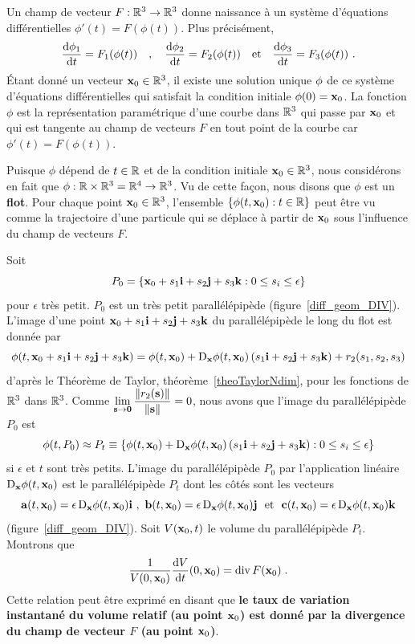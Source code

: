 {Un champ de vecteur $F:\mathbb{R}^3 \to \mathbb{R}^3$ donne naissance à un
système d'équations différentielles $\phi'(t) = F(\phi(t))$.
Plus précisément, 
\[
  \frac{\mathrm{d}\phi_1}{\mathrm{d}t} = F_1(\phi(t)) \quad , \quad
  \frac{\mathrm{d}\phi_2}{\mathrm{d}t} = F_2(\phi(t)) \quad \text{et} \quad
  \frac{\mathrm{d}\phi_3}{\mathrm{d}t} = F_3(\phi(t)) \ .
\]
Étant donné un vecteur $\mathbf{x}_0 \in \mathbb{R}^3$, il existe une solution
unique $\mathbf{\phi}$ de ce système d'équations différentielles qui
satisfait la condition initiale $\phi(0) = \mathbf{x}_0$.  La fonction
$\phi$ est la représentation paramétrique d'une courbe dans $\mathbb{R}^3$
qui passe par $\mathbf{x}_0$ et qui est tangente au champ de vecteurs
$F$ en tout point de la courbe car $\phi'(t) = F(\phi(t))$.

Puisque $\phi$ dépend de $t\in \mathbb{R}$ et de la condition initiale
$\mathbf{x}_0 \in \mathbb{R}^3$, nous considérons en fait que
$\phi: \mathbb{R}\times \mathbb{R}^3 = \mathbb{R}^4 \to \mathbb{R}^3$.  Vu de cette façon, nous disons
que $\phi$ est un {\bfseries flot}.   Pour chaque point
$\mathbf{x}_0 \in \mathbb{R}^3$,  l'ensemble $\{\phi(t,\mathbf{x}_0):t \in \mathbb{R}\}$
peut être vu comme la trajectoire d'une particule qui se déplace à
partir de $\mathbf{x}_0$ sous l'influence du champ de vecteurs $F$.

Soit
\[
P_0 = \left\{ \mathbf{x}_0 + s_1 \mathbf{i} + s_2 \mathbf{j} + s_3 \mathbf{k} :
0\leq s_i \leq \epsilon \right\}
\]
pour $\epsilon$ très petit.  $P_0$ est un très petit parallélépipède
(figure~\ref{diff_geom_DIV}).  L'image d'une
point $\mathbf{x}_0 + s_1 \mathbf{i} + s_2 \mathbf{j} + s_3 \mathbf{k}$ du parallélépipède le
long du flot est donnée par
\[
\phi(t, \mathbf{x}_0 + s_1 \mathbf{i} + s_2 \mathbf{j} + s_3 \mathbf{k})
= \phi(t,\mathbf{x}_0) + \mathrm{D}_{\mathbf{x}} \phi(t,\mathbf{x}_0)
\left( s_1 \mathbf{i} + s_2 \mathbf{j} + s_3 \mathbf{k}\right)
+ r_2(s_1,s_2,s_3)
\]
d'après le Théorème de Taylor, théorème~\ref{theoTaylorNdim}, pour les
fonctions de $\mathbb{R}^3$ dans $\mathbb{R}^3$.  Comme
$\displaystyle \lim_{\mathbf{s}\to \mathbf{0}}
\frac{\|r_2(\mathbf{s})\|}{\|\mathbf{s}\|} = 0$,
nous avons que l'image du parallélépipède $P_0$ est
\[
\phi(t, P_0) \approx 
P_t \equiv \left\{ \phi(t,\mathbf{x}_0) + \mathrm{D}_{\mathbf{x}} \phi(t,\mathbf{x}_0)
  \left( s_1 \mathbf{i} + s_2 \mathbf{j} + s_3 \mathbf{k} \right) : 0\leq s_i \leq
  \epsilon \right\}
\]
si $\epsilon$ et $t$ sont très petits.  L'image du
parallélépipède $P_0$ par l'application linéaire
$\mathrm{D}_{\mathbf{x}}\phi(t,\mathbf{x}_0)$ est le parallélépipède $P_t$
dont les côtés sont les vecteurs
\begin{equation} \label{diff_geom_DD0}
\VEC{a}(t,\VEC{x}_0) = \epsilon\, \diff_{\VEC{x}} \phi(t,\VEC{x}_0) \ii \ , \ 
\VEC{b}(t,\VEC{x}_0) = \epsilon\, \diff_{\VEC{x}} \phi(t,\VEC{x}_0) \jj \
\text{ et } \ 
\VEC{c}(t,\VEC{x}_0) = \epsilon\, \diff_{\VEC{x}} \phi(t,\VEC{x}_0) \kk
\end{equation}
(figure~\ref{diff_geom_DIV}).  Soit $V(\mathbf{x}_0,t)$ le volume du
parallélépipède $P_t$.  Montrons que
\begin{equation} \label{diff_geom_DD3}
\frac{1}{V(0,\mathbf{x}_0)} \frac{\mathrm{d}V}{\mathrm{d}t}(0,\mathbf{x}_0)
= \operatorname{div} F(\mathbf{x}_0) \; .
\end{equation}
Cette relation peut être exprimé en disant que {\bfseries le taux de
variation instantané du volume relatif (au point $\mathbf{x}_0$) est
donné par la divergence du champ de vecteur $F$ (au point
$\mathbf{x}_0$)}.

}
